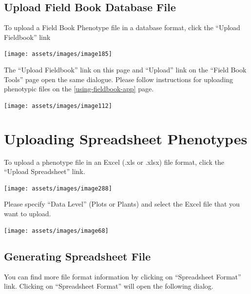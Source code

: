 \documentclass[
  12pt,
]{book}
\begin{document}
\hypertarget{upload-field-book-database-file}{%
\subsection{Upload Field Book Database File}\label{upload-field-book-database-file}}

To upload a Field Book Phenotype file in a database format, click the ``Upload Fieldbook'' link

\begin{center}\texttt{[image: assets/images/image185]} \end{center}

The ``Upload Fieldbook'' link on this page and ``Upload'' link on the ``Field Book Tools'' page open the same dialogue. Please follow instructions for uploading phenotypic files on the \ref{using-fieldbook-app} page.

\begin{center}\texttt{[image: assets/images/image112]} \end{center}

\hypertarget{uploading-spreadsheet-phenotypes}{%
\section{Uploading Spreadsheet Phenotypes}\label{uploading-spreadsheet-phenotypes}}

To upload a phenotype file in an Excel (.xls or .xlsx) file format, click the ``Upload Spreadsheet'' link.

\begin{center}\texttt{[image: assets/images/image288]} \end{center}

Please specify ``Data Level'' (Plots or Plants) and select the Excel file that you want to upload.

\begin{center}\texttt{[image: assets/images/image68]} \end{center}

\hypertarget{generating-spreadsheet-file}{%
\subsection{Generating Spreadsheet File}\label{generating-spreadsheet-file}}

You can find more file format information by clicking on ``Spreadsheet Format'' link. Clicking on ``Spreadsheet Format'' will open the following dialog.
\end{document}
